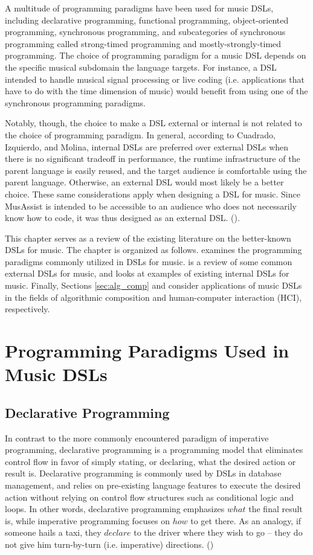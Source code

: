 \documentclass{report}
\newcommand\citeparen[1]{(\cite{#1})}
\begin{document}
A multitude of programming paradigms have been used for music DSLs, including declarative programming, functional programming, object-oriented programming, synchronous programming, and subcategories of synchronous programming called strong-timed programming and mostly-strongly-timed programming. The choice of programming paradigm for a music DSL depends on the specific musical subdomain the language targets. For instance, a DSL intended to handle musical signal processing or live coding (i.e. applications that have to do with the time dimension of music) would benefit from using one of the synchronous programming paradigms. 

Notably, though, the choice to make a DSL external or internal is not related to the choice of programming paradigm. In general, according to Cuadrado, Izquierdo, and Molina, internal DSLs are preferred over external DSLs when there  is  no significant tradeoff in performance, the runtime infrastructure of the parent language is easily reused, and the target audience is comfortable using  the parent language. Otherwise, an external DSL would most likely be a better choice. These same considerations apply when designing a DSL for music. Since MusAssist is intended to be accessible to an audience who does not necessarily know how to code, it was thus designed as an external DSL.
\citeparen{cuadrado_izquierdo_molina_2012}.

This chapter serves as a review of the existing literature on the better-known DSLs for music. The chapter is organized as follows.  examines the programming paradigms commonly utilized in  DSLs for music.  is a review of some common external DSLs for music, and  looks at examples of existing internal  DSLs for music. Finally, Sections \ref{sec:alg_comp} and  consider applications of  music DSLs in the fields of algorithmic composition and human-computer  interaction (HCI), respectively.

\section{Programming Paradigms Used  in Music  DSLs}
\label{sec:prog_paradigms}

\subsection{Declarative Programming}
\label{sec:declarative}
In contrast to the more commonly encountered paradigm of imperative programming, declarative programming is a programming model that eliminates control flow in favor of simply stating, or declaring, what the desired action or result is. Declarative programming is commonly used by DSLs in database management, and relies on pre-existing language features to execute the desired action without relying on control flow structures such as conditional logic and loops. In other words, declarative programming emphasizes $what$ the final result is, while imperative programming focuses on $how$ to get there. As an analogy, if someone hails a taxi, they $declare$ to the driver where they wish to go -- they do not give him turn-by-turn (i.e. imperative) directions. \citeparen{bertram_2021}
\end{document}
